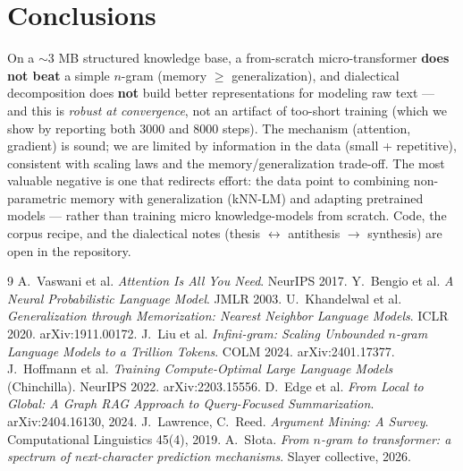 \documentclass[11pt]{article}
\begin{document}
\section{Conclusions}
On a $\sim$3 MB structured knowledge base, a from-scratch micro-transformer \textbf{does not beat} a simple
$n$-gram (memory $\geq$ generalization), and dialectical decomposition does \textbf{not} build better
representations for modeling raw text --- and this is \emph{robust at convergence}, not an artifact of too-short
training (which we show by reporting both 3000 and 8000 steps). The mechanism (attention, gradient) is sound; we are
limited by information in the data (small + repetitive), consistent with scaling laws and the memory/generalization
trade-off. The most valuable negative is one that redirects effort: the data point to combining non-parametric
memory with generalization (kNN-LM) and adapting pretrained models --- rather than training micro knowledge-models
from scratch. Code, the corpus recipe, and the dialectical notes (thesis $\leftrightarrow$ antithesis $\to$
synthesis) are open in the repository.

\begin{thebibliography}{9}
 A.~Vaswani et al. \emph{Attention Is All You Need}. NeurIPS 2017.
 Y.~Bengio et al. \emph{A Neural Probabilistic Language Model}. JMLR 2003.
 U.~Khandelwal et al. \emph{Generalization through Memorization: Nearest Neighbor Language Models}. ICLR 2020. arXiv:1911.00172.
 J.~Liu et al. \emph{Infini-gram: Scaling Unbounded $n$-gram Language Models to a Trillion Tokens}. COLM 2024. arXiv:2401.17377.
 J.~Hoffmann et al. \emph{Training Compute-Optimal Large Language Models} (Chinchilla). NeurIPS 2022. arXiv:2203.15556.
 D.~Edge et al. \emph{From Local to Global: A Graph RAG Approach to Query-Focused Summarization}. arXiv:2404.16130, 2024.
 J.~Lawrence, C.~Reed. \emph{Argument Mining: A Survey}. Computational Linguistics 45(4), 2019.
 A.~Słota. \emph{From $n$-gram to transformer: a spectrum of next-character prediction mechanisms}. Slayer collective, 2026.
\end{thebibliography}
\end{document}
